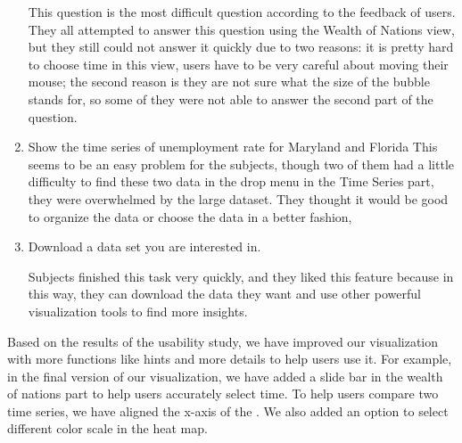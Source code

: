 \documentclass{sigchi}
\begin{document}
\begin{enumerate}
This question is the most difficult question according to the feedback of users. They all attempted to answer this question using the Wealth of Nations view, but they still could not answer it quickly due to two reasons: it is pretty hard to choose time in this view, users have to be very careful about moving their mouse; the second reason is they are not sure what the size of the bubble stands for, so some of they were not able to answer the second part of the question.


\item     Show the time series of unemployment rate for Maryland and Florida
This seems to be an easy problem for the subjects, though two of them had a little difficulty to find these two data in the drop menu in the Time Series part, they were overwhelmed by the large dataset. They thought it would be good to organize the data or choose the data in a better fashion,

\item     Download a data set you are interested in.

Subjects finished this task very quickly, and they liked this feature because in this way, they can download the data they want and use other powerful visualization tools to find more insights.

\end{enumerate}

Based on the results of the usability study, we have improved our visualization with more functions like hints and more details to help users use it. For example, in the final version of our visualization, we have added a slide bar in the wealth of nations part to help users accurately select time. To help users compare two time series, we have aligned the x-axis of the . We also added an option to select different color scale in the heat map.


\end{document}
